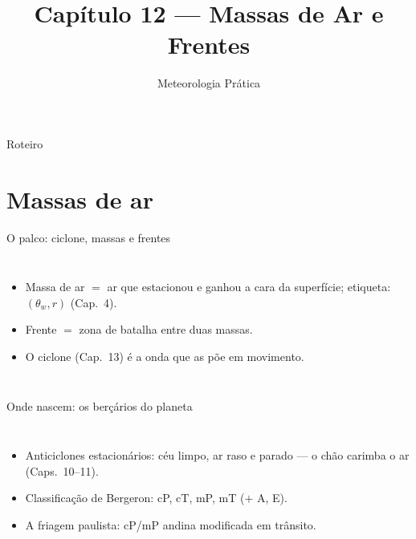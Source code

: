 \documentclass[aspectratio=169,11pt]{beamer}
\title[Cap. 12 --- Massas de Ar e Frentes]{Capítulo 12 --- Massas de Ar e
Frentes}
\subtitle{Meteorologia Prática}
\author{}
\date{}
\begin{document}
\begin{frame}
  \titlepage
  \vfill
  \atribuicao
\end{frame}

\begin{frame}{Roteiro}
  \tableofcontents
\end{frame}

\section{Massas de ar}

\begin{frame}{O palco: ciclone, massas e frentes}
  \begin{columns}
    \begin{itemize}
      \item Massa de ar $=$ ar que estacionou e ganhou a cara da
            superfície; etiqueta: $(\theta_w, r)$ (Cap.~4).
      \item Frente $=$ zona de batalha entre duas massas.
      \item O ciclone (Cap.~13) é a onda que as põe em movimento.
    \end{itemize}
  \end{columns}
\end{frame}

\begin{frame}{Onde nascem: os berçários do planeta}
  \begin{columns}
    \begin{itemize}
      \item Anticiclones estacionários: céu limpo, ar raso e parado —
            o chão carimba o ar (Caps.~10--11).
      \item Classificação de Bergeron: cP, cT, mP, mT ($+$ A, E).
      \item A friagem paulista: cP/mP andina modificada em trânsito.
    \end{itemize}
  \end{columns}
\end{frame}
\end{document}
